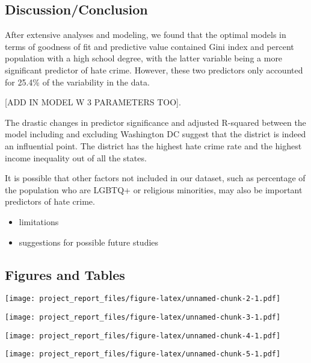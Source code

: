 \documentclass[
]{article}
\providecommand{\tightlist}{%
  \setlength{\itemsep}{0pt}\setlength{\parskip}{0pt}}
\begin{document}
\hypertarget{discussionconclusion}{%
\subsection{Discussion/Conclusion}\label{discussionconclusion}}

After extensive analyses and modeling, we found that the optimal models
in terms of goodness of fit and predictive value contained Gini index
and percent population with a high school degree, with the latter
variable being a more significant predictor of hate crime. However,
these two predictors only accounted for 25.4\% of the variability in the
data.

{[}ADD IN MODEL W 3 PARAMETERS TOO{]}.

The drastic changes in predictor significance and adjusted R-squared
between the model including and excluding Washington DC suggest that the
district is indeed an influential point. The district has the highest
hate crime rate and the highest income inequality out of all the states.

It is possible that other factors not included in our dataset, such as
percentage of the population who are LGBTQ+ or religious minorities, may
also be important predictors of hate crime.

\begin{itemize}
\tightlist
\item
  limitations
\item
  suggestions for possible future studies
\end{itemize}

\hypertarget{figures-and-tables}{%
\subsection{Figures and Tables}\label{figures-and-tables}}

\texttt{[image: project\_report\_files/figure-latex/unnamed-chunk-2-1.pdf]}

\texttt{[image: project\_report\_files/figure-latex/unnamed-chunk-3-1.pdf]}

\texttt{[image: project\_report\_files/figure-latex/unnamed-chunk-4-1.pdf]}

\texttt{[image: project\_report\_files/figure-latex/unnamed-chunk-5-1.pdf]}
\end{document}
